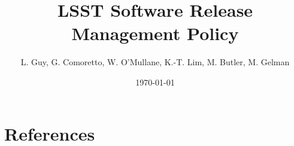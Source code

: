 \documentclass[DM,lsstdraft,toc]{lsstdoc}
\title{LSST Software \gls{Release} Management Policy}
\author{%
L. Guy, G. Comoretto, W. O'Mullane, K.-T. Lim, M. \gls{Butler}, M. Gelman
}
\date{\today}
\begin{document}
\maketitle



\newpage


\newpage


\appendix



\section{References} \label{sec:bib}


\printglossaries
\end{document}

